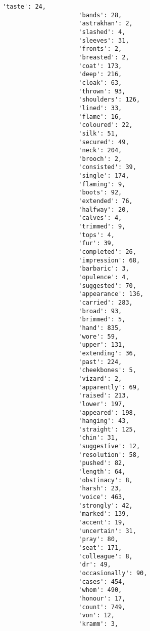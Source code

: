 \documentclass[11pt]{article}
\begin{document}
\begin{Verbatim}[commandchars=\\\{\}]
                     'taste': 24,
                     'bands': 28,
                     'astrakhan': 2,
                     'slashed': 4,
                     'sleeves': 31,
                     'fronts': 2,
                     'breasted': 2,
                     'coat': 173,
                     'deep': 216,
                     'cloak': 63,
                     'thrown': 93,
                     'shoulders': 126,
                     'lined': 33,
                     'flame': 16,
                     'coloured': 22,
                     'silk': 51,
                     'secured': 49,
                     'neck': 204,
                     'brooch': 2,
                     'consisted': 39,
                     'single': 174,
                     'flaming': 9,
                     'boots': 92,
                     'extended': 76,
                     'halfway': 20,
                     'calves': 4,
                     'trimmed': 9,
                     'tops': 4,
                     'fur': 39,
                     'completed': 26,
                     'impression': 68,
                     'barbaric': 3,
                     'opulence': 4,
                     'suggested': 70,
                     'appearance': 136,
                     'carried': 283,
                     'broad': 93,
                     'brimmed': 5,
                     'hand': 835,
                     'wore': 59,
                     'upper': 131,
                     'extending': 36,
                     'past': 224,
                     'cheekbones': 5,
                     'vizard': 2,
                     'apparently': 69,
                     'raised': 213,
                     'lower': 197,
                     'appeared': 198,
                     'hanging': 43,
                     'straight': 125,
                     'chin': 31,
                     'suggestive': 12,
                     'resolution': 58,
                     'pushed': 82,
                     'length': 64,
                     'obstinacy': 8,
                     'harsh': 23,
                     'voice': 463,
                     'strongly': 42,
                     'marked': 139,
                     'accent': 19,
                     'uncertain': 31,
                     'pray': 80,
                     'seat': 171,
                     'colleague': 8,
                     'dr': 49,
                     'occasionally': 90,
                     'cases': 454,
                     'whom': 490,
                     'honour': 17,
                     'count': 749,
                     'von': 12,
                     'kramm': 3,

\end{Verbatim}
\end{document}

